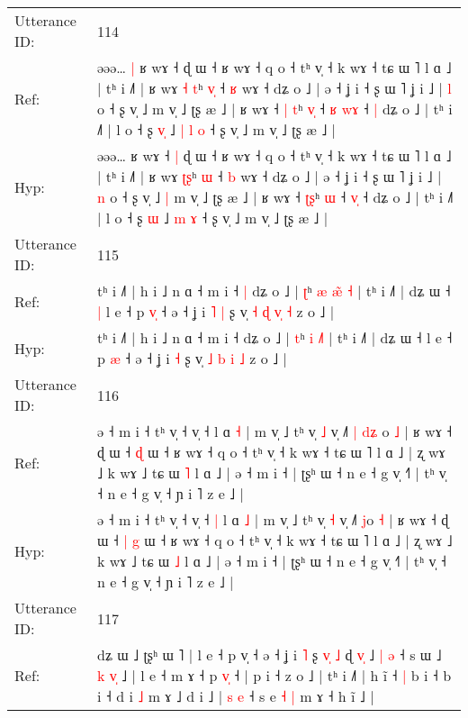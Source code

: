 \documentclass[10pt]{article}
\DeclareRobustCommand{\hl}[1]{{\textcolor{red}{#1}}}
\begin{document}
\begin{longtable}{ll}
 \\
\midrule
Utterance ID: & 114 \\
Ref: & əəə…\hl{ }\hl{|} ʁ wɤ ˧\hl{}\hl{} ɖ ɯ ˧ ʁ wɤ ˧ q o ˧ tʰ v̩ ˧ k wɤ ˧ tɕ ɯ ˥ l ɑ ˩ | tʰ i ˩˥ | ʁ wɤ \hl{˧}\hl{ }\hl{t}ʰ \hl{v}\hl{̩} ˧ \hl{ʁ} wɤ ˧ dʑ o ˩ | ə ˧ ʝ i ˧ ʂ ɯ ˥ ʝ i ˩ | \hl{l} o ˧ ʂ v̩ ˩\hl{}\hl{} m v̩ ˩ ʈʂ æ ˩ | ʁ wɤ ˧ \hl{|}\hl{ }\hl{t}ʰ \hl{v}\hl{̩} ˧\hl{ }\hl{ʁ} \hl{w}\hl{ɤ} ˧\hl{ }\hl{|} dʑ o ˩ | tʰ i ˩˥ | l o ˧ ʂ \hl{v}\hl{̩} ˩\hl{ }\hl{|} \hl{l} \hl{o} ˧ ʂ v̩ ˩ m v̩ ˩ ʈʂ æ ˩ |
 \\
Hyp: & əəə…\hl{}\hl{} ʁ wɤ ˧\hl{ }\hl{|} ɖ ɯ ˧ ʁ wɤ ˧ q o ˧ tʰ v̩ ˧ k wɤ ˧ tɕ ɯ ˥ l ɑ ˩ | tʰ i ˩˥ | ʁ wɤ \hl{}\hl{ʈ}\hl{ʂ}ʰ \hl{}\hl{ɯ} ˧ \hl{b} wɤ ˧ dʑ o ˩ | ə ˧ ʝ i ˧ ʂ ɯ ˥ ʝ i ˩ | \hl{n} o ˧ ʂ v̩ ˩\hl{ }\hl{|} m v̩ ˩ ʈʂ æ ˩ | ʁ wɤ ˧ \hl{}\hl{ʈ}\hl{ʂ}ʰ \hl{}\hl{ɯ} ˧\hl{}\hl{} \hl{v}\hl{̩} ˧\hl{}\hl{} dʑ o ˩ | tʰ i ˩˥ | l o ˧ ʂ \hl{}\hl{ɯ} ˩\hl{}\hl{} \hl{m} \hl{ɤ} ˧ ʂ v̩ ˩ m v̩ ˩ ʈʂ æ ˩ |
 \\
\midrule
Utterance ID: & 115 \\
Ref: & tʰ i ˩˥ | h i ˩ n ɑ ˧ m i ˧\hl{ }\hl{|} dʑ o ˩ | \hl{ʈ}ʰ \hl{æ} \hl{æ}\hl{̃}\hl{ }\hl{˧} | tʰ i ˩˥ | dʑ ɯ ˧\hl{ }\hl{|} l e ˧ p \hl{v}\hl{̩} ˧ ə ˧ ʝ i\hl{ }\hl{˥} \hl{|} ʂ v̩ \hl{˧} \hl{ɖ} \hl{v}\hl{̩} \hl{˧} z o ˩ |
 \\
Hyp: & tʰ i ˩˥ | h i ˩ n ɑ ˧ m i ˧\hl{}\hl{} dʑ o ˩ | \hl{t}ʰ \hl{i} \hl{}\hl{}\hl{˩}\hl{˥} | tʰ i ˩˥ | dʑ ɯ ˧\hl{}\hl{} l e ˧ p \hl{}\hl{æ} ˧ ə ˧ ʝ i\hl{}\hl{} \hl{˧} ʂ v̩ \hl{˩} \hl{b} \hl{}\hl{i} \hl{˩} z o ˩ |
 \\
\midrule
Utterance ID: & 116 \\
Ref: & ə ˧ m i ˧ tʰ v̩ ˧ v̩ ˧\hl{}\hl{} l ɑ \hl{˧} | m v̩ ˩ tʰ v̩ \hl{˩} v̩ ˩˥\hl{ }\hl{|} \hl{d}\hl{ʑ}\hl{ }o \hl{˩} | ʁ wɤ ˧ ɖ ɯ ˧\hl{}\hl{} \hl{ɖ} ɯ ˧ ʁ wɤ ˧ q o ˧ tʰ v̩ ˧ k wɤ ˧ tɕ ɯ ˥ l ɑ ˩ | ʐ wɤ ˩ k wɤ ˩ tɕ ɯ \hl{˥} l ɑ ˩ | ə ˧ m i ˧ | ʈʂʰ ɯ ˧ n e ˧ g v̩ ˧˥ | tʰ v̩ ˧ n e ˧ g v̩ ˧ ɲ i ˥ z e ˩ |
 \\
Hyp: & ə ˧ m i ˧ tʰ v̩ ˧ v̩ ˧\hl{ }\hl{|} l ɑ \hl{˩} | m v̩ ˩ tʰ v̩ \hl{˧} v̩ ˩˥\hl{}\hl{} \hl{}\hl{}\hl{j}o \hl{˧} | ʁ wɤ ˧ ɖ ɯ ˧\hl{ }\hl{|} \hl{g} ɯ ˧ ʁ wɤ ˧ q o ˧ tʰ v̩ ˧ k wɤ ˧ tɕ ɯ ˥ l ɑ ˩ | ʐ wɤ ˩ k wɤ ˩ tɕ ɯ \hl{˩} l ɑ ˩ | ə ˧ m i ˧ | ʈʂʰ ɯ ˧ n e ˧ g v̩ ˧˥ | tʰ v̩ ˧ n e ˧ g v̩ ˧ ɲ i ˥ z e ˩ |
 \\
\midrule
Utterance ID: & 117 \\
Ref: & dʑ ɯ ˩ ʈʂʰ ɯ ˥ | l e ˧ p v̩ ˧\hl{} ə ˧ ʝ i \hl{˥} ʂ \hl{v}\hl{̩} \hl{˩} ɖ \hl{v}\hl{̩} ˩ \hl{|} \hl{ə} ˧ s ɯ ˩\hl{ }\hl{k} \hl{v}\hl{̩} ˩ | l e ˧ m ɤ ˧ p \hl{v}\hl{̩} ˧\hl{} | p i ˧ z o ˩ | tʰ i ˩˥ | h ĩ ˧\hl{ }\hl{|} b i ˧ b i ˧ d i \hl{˩} m ɤ ˩ d i ˩ | \hl{s} \hl{e} ˧ s e\hl{ }\hl{˧} \hl{|} m ɤ ˧ h ĩ ˩ |

\end{longtable}
\end{document}
